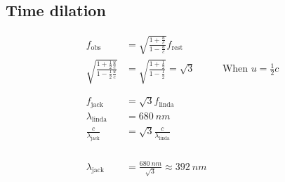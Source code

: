 \documentclass[12pt]{article}
\begin{document}
\subsection{Time dilation}
\begin{align*}
	f_\text{obs}                                                           & = \sqrt{\frac{1 + \frac{u}{c}}{1 - \frac{u}{c}}} f_\text{rest}                                     \\
	\sqrt{\frac{1 + \frac{1}{2} \frac{u}{c}}{1 - \frac{1}{2} \frac{u}{c}}} & = \sqrt{\frac{1+\frac{1}{2}}{1 - \frac{1}{2}}} = \sqrt{3}      &  & \text{When } u = \frac{1}{2} c \\
	\phantom{=}                                                                                                                                                                 \\
	f_\text{jack}                                                          & = \sqrt{3} f_\text{linda}                                                                          \\
	\lambda_\text{linda}                                                   & = 680 ~nm                                                                                          \\
	\frac{c}{\lambda_\text{jack}}                                          & = \sqrt{3} \frac{c}{\lambda_\text{linda}}                                                          \\
	\phantom{=}                                                                                                                                                                 \\
	\phantom{=}                                                                                                                                                                 \\
	\lambda_\text{jack}                                                    & = \frac{680 ~nm}{\sqrt{3}} \approx 392 ~nm
\end{align*}
\end{document}

